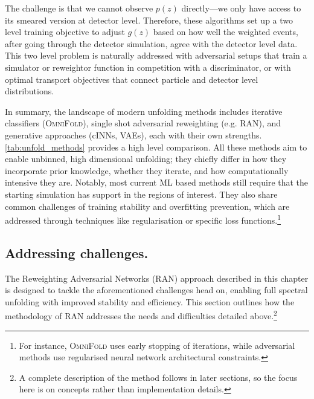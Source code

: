 {{        The challenge is that we cannot observe $p(z)$ directly---we only have access to its smeared version at detector level.
        Therefore, these algorithms set up a two level training objective to adjust $g(z)$ based on how well the weighted events, after going through the detector simulation, agree with the detector level data.
        This two level problem is naturally addressed with adversarial setups that train a simulator or reweightor function in competition with a discriminator, or with optimal transport objectives that connect particle and detector level distributions.

        In summary, the landscape of modern unfolding methods includes iterative classifiers (\textsc{OmniFold}), single shot adversarial reweighting (e.g. RAN), and generative approaches (cINNs, VAEs), each with their own strengths.
        \cref{tab:unfold_methods} provides a high level comparison.
        All these methods aim to enable unbinned, high dimensional unfolding; they chiefly differ in how they incorporate prior knowledge, whether they iterate, and how computationally intensive they are.
        Notably, most current ML based methods still require that the starting simulation has support in the regions of interest.
        They also share common challenges of training stability and overfitting prevention, which are addressed through techniques like regularisation or specific loss functions.\footnote{For instance, \textsc{OmniFold} uses early stopping of iterations, while adversarial methods use regularised neural network architectural constraints.}

        

    \subsection{Addressing challenges.}
        The Reweighting Adversarial Networks (RAN) approach described in this chapter is designed to tackle the aforementioned challenges head on, enabling full spectral unfolding with improved stability and efficiency.
        This section outlines how the methodology of RAN addresses the needs and difficulties detailed above.\footnote{A complete description of the method follows in later sections, so the focus here is on concepts rather than implementation details.}
        
}}
